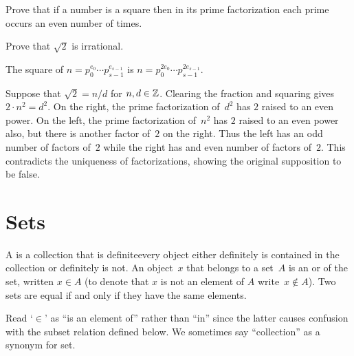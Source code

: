 \documentclass{ibl}  %
\begin{document}
\begin{ex} 
\begin{exes}
\item Prove that if a number is a square then in its prime factorization 
  each prime occurs an even number of times.
\item Prove that $\sqrt{2}$ is irrational.
\end{exes}
\begin{ans}
\begin{exes}
\item The square of $n=p_0^{e_0}\cdots p_{s-1}^{e_{s-1}}$ is
  $n=p_0^{2e_0}\cdots p_{s-1}^{2e_{s-1}}$.
\item Suppose that $\sqrt{2}=n/d$ for $n,d\in\mathbb{Z}$.
  Clearing the fraction and squaring gives $2\cdot n^2=d^2$.
  On the right, the prime factorization of~$d^2$ has $2$ raised to an even 
  power.
  On the left, the prime factorization of~$n^2$ has $2$ raised to an even power
  also, but there is another factor of~$2$ on the right.
  Thus the left has an odd number of factors of~$2$ while the right has
  and even number of factors of~$2$.
  This contradicts the uniqueness of factorizations, showing the 
  original supposition to be false. 
\end{exes}
\end{ans}
\end{ex}










\chapter{Sets}
\begin{df}
A  is a collection that is definite\Dash every 
object either
definitely is contained in the collection or definitely is not.
An object~$x$ that belongs to a set~$A$ is an 
or 
of the set, written $x\in A$
(to denote that $x$ is not an element of $A$ write~$x\notin A$).
Two sets are equal if and only if they have the same elements.
\end{df}
\noindent Read `$\in$' as ``is an element of'' rather than ``in'' since the 
latter causes confusion with 
the subset relation defined below.
We sometimes say ``collection'' as a synonym for set.
\end{document}
